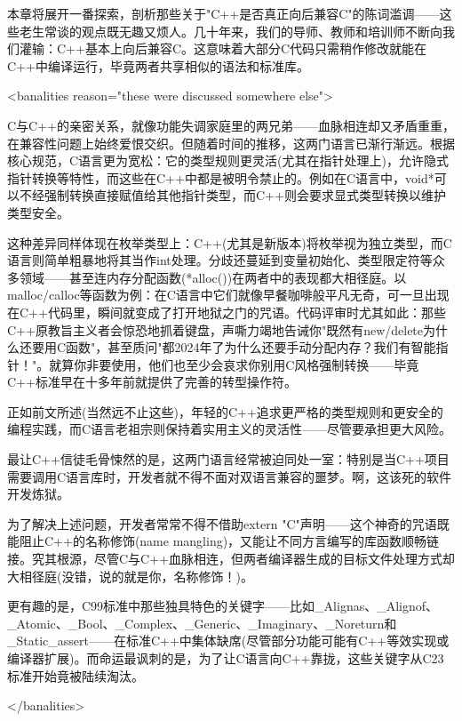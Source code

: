 
本章将展开一番探索，剖析那些关于"C++是否真正向后兼容C"的陈词滥调——这些老生常谈的观点既无趣又烦人。几十年来，我们的导师、教师和培训师不断向我们灌输：C++基本上向后兼容C。这意味着大部分C代码只需稍作修改就能在C++中编译运行，毕竟两者共享相似的语法和标准库。

\begin{shell}
<banalities reason="these were discussed somewhere else">
\end{shell}

C与C++的亲密关系，就像功能失调家庭里的两兄弟——血脉相连却又矛盾重重，在兼容性问题上始终爱恨交织。但随着时间的推移，这两门语言已渐行渐远。根据核心规范，C语言更为宽松：它的类型规则更灵活(尤其在指针处理上)，允许隐式指针转换等特性，而这些在C++中都是被明令禁止的。例如在C语言中，void*可以不经强制转换直接赋值给其他指针类型，而C++则会要求显式类型转换以维护类型安全。

这种差异同样体现在枚举类型上：C++(尤其是新版本)将枚举视为独立类型，而C语言则简单粗暴地将其当作int处理。分歧还蔓延到变量初始化、类型限定符等众多领域——甚至连内存分配函数(*alloc())在两者中的表现都大相径庭。以malloc/calloc等函数为例：在C语言中它们就像早餐咖啡般平凡无奇，可一旦出现在C++代码里，瞬间就变成了打开地狱之门的咒语。代码评审时尤其如此：那些C++原教旨主义者会惊恐地抓着键盘，声嘶力竭地告诫你"既然有new/delete为什么还要用C函数"，甚至质问"都2024年了为什么还要手动分配内存？我们有智能指针！"。就算你非要使用，他们也至少会哀求你别用C风格强制转换——毕竟C++标准早在十多年前就提供了完善的转型操作符。

正如前文所述(当然远不止这些)，年轻的C++追求更严格的类型规则和更安全的编程实践，而C语言老祖宗则保持着实用主义的灵活性——尽管要承担更大风险。

最让C++信徒毛骨悚然的是，这两门语言经常被迫同处一室：特别是当C++项目需要调用C语言库时，开发者就不得不面对双语言兼容的噩梦。啊，这该死的软件开发炼狱。

为了解决上述问题，开发者常常不得不借助extern "C"声明——这个神奇的咒语既能阻止C++的名称修饰(name mangling)，又能让不同方言编写的库函数顺畅链接。究其根源，尽管C与C++血脉相连，但两者编译器生成的目标文件处理方式却大相径庭(没错，说的就是你，名称修饰！)。

更有趣的是，C99标准中那些独具特色的关键字——比如\_Alignas、\_Alignof、\_Atomic、\_Bool、\_Complex、\_Generic、\_Imaginary、\_Noreturn和\_Static\_assert——在标准C++中集体缺席(尽管部分功能可能有C++等效实现或编译器扩展)。而命运最讽刺的是，为了让C语言向C++靠拢，这些关键字从C23标准开始竟被陆续淘汰。

\begin{shell}
</banalities>
\end{shell}

